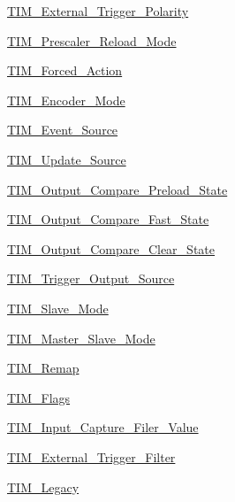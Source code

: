 \begin{DoxyCompactItemize}
\item 
\hyperlink{group___t_i_m___external___trigger___polarity}{T\+I\+M\+\_\+\+External\+\_\+\+Trigger\+\_\+\+Polarity}
\item 
\hyperlink{group___t_i_m___prescaler___reload___mode}{T\+I\+M\+\_\+\+Prescaler\+\_\+\+Reload\+\_\+\+Mode}
\item 
\hyperlink{group___t_i_m___forced___action}{T\+I\+M\+\_\+\+Forced\+\_\+\+Action}
\item 
\hyperlink{group___t_i_m___encoder___mode}{T\+I\+M\+\_\+\+Encoder\+\_\+\+Mode}
\item 
\hyperlink{group___t_i_m___event___source}{T\+I\+M\+\_\+\+Event\+\_\+\+Source}
\item 
\hyperlink{group___t_i_m___update___source}{T\+I\+M\+\_\+\+Update\+\_\+\+Source}
\item 
\hyperlink{group___t_i_m___output___compare___preload___state}{T\+I\+M\+\_\+\+Output\+\_\+\+Compare\+\_\+\+Preload\+\_\+\+State}
\item 
\hyperlink{group___t_i_m___output___compare___fast___state}{T\+I\+M\+\_\+\+Output\+\_\+\+Compare\+\_\+\+Fast\+\_\+\+State}
\item 
\hyperlink{group___t_i_m___output___compare___clear___state}{T\+I\+M\+\_\+\+Output\+\_\+\+Compare\+\_\+\+Clear\+\_\+\+State}
\item 
\hyperlink{group___t_i_m___trigger___output___source}{T\+I\+M\+\_\+\+Trigger\+\_\+\+Output\+\_\+\+Source}
\item 
\hyperlink{group___t_i_m___slave___mode}{T\+I\+M\+\_\+\+Slave\+\_\+\+Mode}
\item 
\hyperlink{group___t_i_m___master___slave___mode}{T\+I\+M\+\_\+\+Master\+\_\+\+Slave\+\_\+\+Mode}
\item 
\hyperlink{group___t_i_m___remap}{T\+I\+M\+\_\+\+Remap}
\item 
\hyperlink{group___t_i_m___flags}{T\+I\+M\+\_\+\+Flags}
\item 
\hyperlink{group___t_i_m___input___capture___filer___value}{T\+I\+M\+\_\+\+Input\+\_\+\+Capture\+\_\+\+Filer\+\_\+\+Value}
\item 
\hyperlink{group___t_i_m___external___trigger___filter}{T\+I\+M\+\_\+\+External\+\_\+\+Trigger\+\_\+\+Filter}
\item 
\hyperlink{group___t_i_m___legacy}{T\+I\+M\+\_\+\+Legacy}
\end{DoxyCompactItemize}

